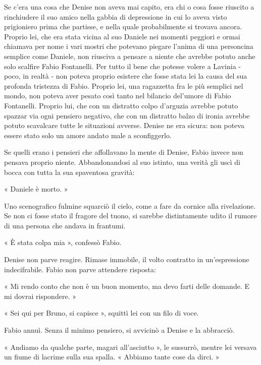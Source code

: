 Se c'era una cosa che Denise non aveva mai capito, era chi o cosa fosse riuscito a rinchiudere il suo amico nella gabbia di depressione in cui lo aveva visto prigioniero prima che partisse, e nella quale probabilmente si trovava ancora. Proprio lei, che era stata vicina al suo Daniele nei momenti peggiori e ormai chiamava per nome i vari mostri che potevano piegare l'anima di una personcina semplice come Daniele, non riusciva a pensare a niente che avrebbe potuto anche solo scalfire Fabio Fontanelli. Per tutto il bene che potesse volere a Lavinia - poco, in realtà - non poteva proprio esistere che fosse stata lei la causa del sua profonda tristezza di Fabio. Proprio lei, una ragazzetta fra le più semplici nel mondo, non poteva aver pesato così tanto nel bilancio del'umore di Fabio Fontanelli. Proprio lui, che con un distratto colpo d'arguzia avrebbe potuto spazzar via ogni pensiero negativo, che con un distratto balzo di ironia avrebbe potuto scavalcare tutte le situazioni avverse. Denise ne era sicura: non poteva essere stato solo un amore andato male a sconfiggerlo.

Se quelli erano i pensieri che affollavano la mente di Denise, Fabio invece non pensava proprio niente. Abbandonandosi al suo istinto, una verità gli uscì di bocca con tutta la sua spaventosa gravità:

« Daniele è morto. »

Uno scenografico fulmine squarciò il cielo, come a fare da cornice alla rivelazione. Se non ci fosse stato il fragore del tuono, si sarebbe distintamente udito il rumore di una persona che andava in frantumi.

« È stata colpa mia », confessò Fabio.

Denise non parve reagire. Rimase immobile, il volto contratto in un'espressione indecifrabile. Fabio non parve attendere risposta:

« Mi rendo conto che non è un buon momento, ma devo farti delle domande. E mi dovrai rispondere. »

« Sei qui per Bruno, si capisce », squittì lei con un filo di voce.

Fabio annuì. Senza il minimo pensiero, si avvicinò a Denise e la abbracciò.

« Andiamo da qualche parte, magari all'asciutto », le sussurrò, mentre lei versava un fiume di lacrime sulla sua spalla. « Abbiamo tante cose da dirci. »
